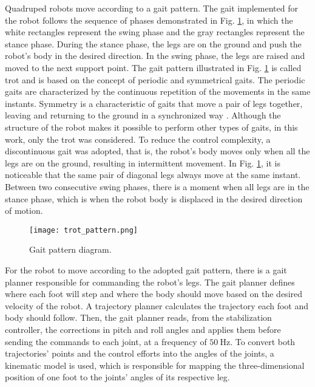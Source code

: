 \documentclass[conference]{IEEEtran}
\begin{document}
Quadruped robots move according to a gait pattern. The gait implemented for the robot follows the sequence of phases demonstrated in Fig. \ref{fig:trot_pattern}, in which the white rectangles represent the swing phase and the gray rectangles represent the stance phase. During the stance phase, the legs are on the ground and push the robot's body in the desired direction. In the swing phase, the legs are raised and moved to the next support point. The gait pattern illustrated in Fig. \ref{fig:trot_pattern} is called trot and is based on the concept of periodic and symmetrical gaits. The periodic gaits are characterized by the continuous repetition of the movements in the same instants. Symmetry is a characteristic of gaits that move a pair of legs together, leaving and returning to the ground in a synchronized way \cite{de2006quadrupedal}. Although the structure of the robot makes it possible to perform other types of gaits, in this work, only the trot was considered. To reduce the control complexity, a discontinuous gait was adopted, that is, the robot's body moves only when all the legs are on the ground, resulting in intermittent movement. In Fig. \ref{fig:trot_pattern}, it is noticeable that the same pair of diagonal legs always move at the same instant. Between two consecutive swing phases, there is a moment when all legs are in the stance phase, which is when the robot body is displaced in the desired direction of motion.

\begin{figure}[b]
  \vspace{-\baselineskip}
  \centering
  \texttt{[image: trot\_pattern.png]}
  \vfill
  \caption{Gait pattern diagram.}
  \label{fig:trot_pattern}
\end{figure}

For the robot to move according to the adopted gait pattern, there is a gait planner responsible for commanding the robot's legs. The gait planner defines where each foot will step and where the body should move based on the desired velocity of the robot. A trajectory planner calculates the trajectory each foot and body should follow. Then, the gait planner reads, from the stabilization controller, the corrections in pitch and roll angles and applies them before sending the commands to each joint, at a frequency of $\SI{50}{\hertz}$. To convert both trajectories' points and the control efforts into the angles of the joints, a kinematic model is used, which is responsible for mapping the three-dimensional position of one foot to the joints' angles of its respective leg.
\end{document}
